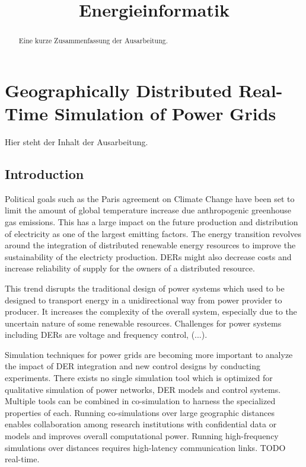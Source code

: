 \documentclass[a4paper,ngerman]{atseminar}
\title{Energieinformatik}
\author{}
\begin{document}
\maketitle

\GERMAN

\section{Geographically Distributed Real-Time Simulation of Power Grids}

\begin{abstract}
Eine kurze Zusammenfassung der Ausarbeitung. 
\end{abstract}

Hier steht der Inhalt der Ausarbeitung.

\subsection{Introduction}

Political goals such as the Paris agreement on Climate Change have been set to limit the amount of global temperature increase due anthropogenic greenhouse gas emissions. This has a large impact on the future production and distribution of electricity as one of the largest emitting factors. The energy transition revolves around the integration of distributed renewable energy resources to improve the sustainability of the electricty production. DERs might also decrease costs and increase
reliability of supply for the owners of a distributed resource. 

This trend disrupts the traditional design of power systems which used to be designed to transport energy in a unidirectional way from power provider to producer. It increases the complexity of the overall system, especially due to the uncertain nature of some renewable resources. Challenges for power systems including DERs are voltage and frequency control, (...). 

Simulation techniques for power grids are becoming more important to analyze the impact of DER integration and new control designs by conducting experiments. There exists no single simulation tool which is optimized for qualitative simulation of power networks, DER models and control systems. Multiple tools can be combined in co-simulation to harness the specialized properties of each. Running co-simulations over large geographic distances enables collaboration among research
institutions with confidential data or models and improves overall computational power. Running high-frequency simulations over distances requires high-latency communication links. 
TODO real-time.
\end{document}
